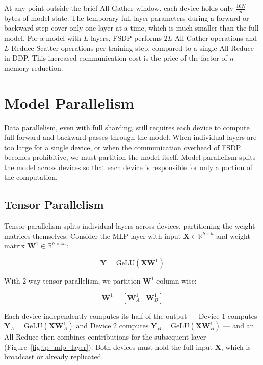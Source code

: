 \documentclass{book}
\begin{document}
At any point outside the brief All-Gather window, each device holds only
$\frac{16N}{n}$ bytes of model state. The temporary full-layer parameters
during a forward or backward step cover only one layer at a time, which is
much smaller than the full model. For a model with $L$ layers, FSDP performs
$2L$ All-Gather operations and $L$ Reduce-Scatter operations per training
step, compared to a single All-Reduce in DDP. This increased communication
cost is the price of the factor-of-$n$ memory reduction.

\section{Model Parallelism}
\label{sec:model_parallelism}
 
Data parallelism, even with full sharding, still requires each device to
compute full forward and backward passes through the model. When individual
layers are too large for a single device, or when the communication overhead
of FSDP becomes prohibitive, we must partition the model itself. Model
parallelism splits the model across devices so that each device is
responsible for only a portion of the computation.
 
\subsection{Tensor Parallelism}
\label{sec:tensor_parallelism}
 
Tensor parallelism splits individual layers across devices, partitioning
the weight matrices themselves. Consider the MLP layer with input
$\mathbf{X} \in \mathbb{R}^{b \times h}$ and weight matrix
$\mathbf{W}^1 \in \mathbb{R}^{h \times 4h}$:
 
\begin{equation}
\label{eq:mlp_layer}
\mathbf{Y} = \text{GeLU}(\mathbf{X}\mathbf{W}^1)
\end{equation}
 
With 2-way tensor parallelism, we partition $\mathbf{W}^1$ column-wise:
 
\begin{equation}
\label{eq:tp_split}
\mathbf{W}^1 = [\mathbf{W}^1_A \mid \mathbf{W}^1_B]
\end{equation}
 
Each device independently computes its half of the output --- Device 1
computes $\mathbf{Y}_A = \text{GeLU}(\mathbf{X}\mathbf{W}^1_A)$ and Device 2
computes $\mathbf{Y}_B = \text{GeLU}(\mathbf{X}\mathbf{W}^1_B)$ --- and an
All-Reduce then combines contributions for the subsequent layer
(Figure~\ref{fig:tp_mlp_layer}). Both devices must hold the full input
$\mathbf{X}$, which is broadcast or already replicated.
 
\end{document}
